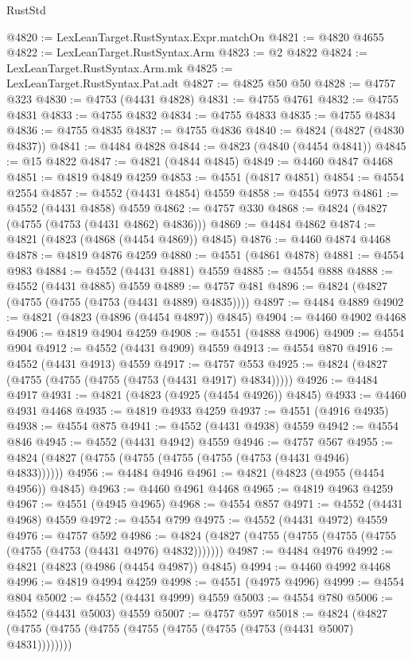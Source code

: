 \begin{lexlean}{RustStd}
\begin{coremodule}
@4820 := LexLeanTarget.RustSyntax.Expr.matchOn
@4821 := @4820 @4655
@4822 := LexLeanTarget.RustSyntax.Arm
@4823 := @2 @4822
@4824 := LexLeanTarget.RustSyntax.Arm.mk
@4825 := LexLeanTarget.RustSyntax.Pat.adt
@4827 := @4825 @50 @50
@4828 := @4757 @323
@4830 := @4753 (@4431 @4828)
@4831 := @4755 @4761
@4832 := @4755 @4831
@4833 := @4755 @4832
@4834 := @4755 @4833
@4835 := @4755 @4834
@4836 := @4755 @4835
@4837 := @4755 @4836
@4840 := @4824 (@4827 (@4830 @4837))
@4841 := @4484 @4828
@4844 := @4823 (@4840 (@4454 @4841))
@4845 := @15 @4822
@4847 := @4821 (@4844 @4845)
@4849 := @4460 @4847 @4468
@4851 := @4819 @4849 @4259
@4853 := @4551 (@4817 @4851)
@4854 := @4554 @2554
@4857 := @4552 (@4431 @4854) @4559
@4858 := @4554 @973
@4861 := @4552 (@4431 @4858) @4559
@4862 := @4757 @330
@4868 := @4824 (@4827 (@4755 (@4753 (@4431 @4862) @4836)))
@4869 := @4484 @4862
@4874 := @4821 (@4823 (@4868 (@4454 @4869)) @4845)
@4876 := @4460 @4874 @4468
@4878 := @4819 @4876 @4259
@4880 := @4551 (@4861 @4878)
@4881 := @4554 @983
@4884 := @4552 (@4431 @4881) @4559
@4885 := @4554 @888
@4888 := @4552 (@4431 @4885) @4559
@4889 := @4757 @481
@4896 := @4824 (@4827 (@4755 (@4755 (@4753 (@4431 @4889) @4835))))
@4897 := @4484 @4889
@4902 := @4821 (@4823 (@4896 (@4454 @4897)) @4845)
@4904 := @4460 @4902 @4468
@4906 := @4819 @4904 @4259
@4908 := @4551 (@4888 @4906)
@4909 := @4554 @904
@4912 := @4552 (@4431 @4909) @4559
@4913 := @4554 @870
@4916 := @4552 (@4431 @4913) @4559
@4917 := @4757 @553
@4925 := @4824 (@4827 (@4755 (@4755 (@4755 (@4753 (@4431 @4917) @4834)))))
@4926 := @4484 @4917
@4931 := @4821 (@4823 (@4925 (@4454 @4926)) @4845)
@4933 := @4460 @4931 @4468
@4935 := @4819 @4933 @4259
@4937 := @4551 (@4916 @4935)
@4938 := @4554 @875
@4941 := @4552 (@4431 @4938) @4559
@4942 := @4554 @846
@4945 := @4552 (@4431 @4942) @4559
@4946 := @4757 @567
@4955 := @4824 (@4827 (@4755 (@4755 (@4755 (@4755 (@4753 (@4431 @4946) @4833))))))
@4956 := @4484 @4946
@4961 := @4821 (@4823 (@4955 (@4454 @4956)) @4845)
@4963 := @4460 @4961 @4468
@4965 := @4819 @4963 @4259
@4967 := @4551 (@4945 @4965)
@4968 := @4554 @857
@4971 := @4552 (@4431 @4968) @4559
@4972 := @4554 @799
@4975 := @4552 (@4431 @4972) @4559
@4976 := @4757 @592
@4986 := @4824 (@4827 (@4755 (@4755 (@4755 (@4755 (@4755 (@4753 (@4431 @4976) @4832)))))))
@4987 := @4484 @4976
@4992 := @4821 (@4823 (@4986 (@4454 @4987)) @4845)
@4994 := @4460 @4992 @4468
@4996 := @4819 @4994 @4259
@4998 := @4551 (@4975 @4996)
@4999 := @4554 @804
@5002 := @4552 (@4431 @4999) @4559
@5003 := @4554 @780
@5006 := @4552 (@4431 @5003) @4559
@5007 := @4757 @597
@5018 := @4824 (@4827 (@4755 (@4755 (@4755 (@4755 (@4755 (@4755 (@4753 (@4431 @5007) @4831))))))))

\end{coremodule}
\end{lexlean}
